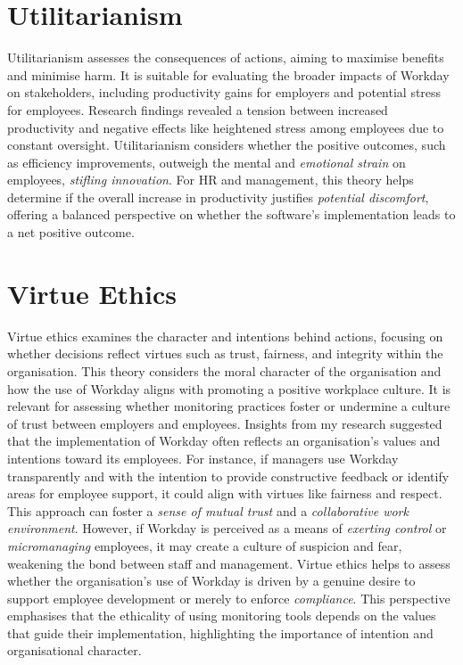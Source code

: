 \documentclass[a4paper]{article}
\begin{document}
\section*{Utilitarianism}
Utilitarianism assesses the consequences of actions, aiming to maximise benefits and minimise harm. It is suitable for evaluating the broader impacts of Workday on stakeholders, including productivity gains for employers and potential stress for employees.
Research findings revealed a tension between increased productivity and negative effects like heightened stress among employees due to constant oversight. Utilitarianism considers whether the positive outcomes, such as efficiency improvements, outweigh the mental and \textit{emotional strain} on employees, \textit{stifling innovation}. For HR and management, this theory helps determine if the overall increase in productivity justifies \textit{potential discomfort}, offering a balanced perspective on whether the software’s implementation leads to a net positive outcome.

\section*{Virtue Ethics}
Virtue ethics examines the character and intentions behind actions, focusing on whether decisions reflect virtues such as trust, fairness, and integrity within the organisation. This theory considers the moral character of the organisation and how the use of Workday aligns with promoting a positive workplace culture. It is relevant for assessing whether monitoring practices foster or undermine a culture of trust between employers and employees.
Insights from my research suggested that the implementation of Workday often reflects an organisation’s values and intentions toward its employees. For instance, if managers use Workday transparently and with the intention to provide constructive feedback or identify areas for employee support, it could align with virtues like fairness and respect. This approach can foster a \textit{sense of mutual trust} and a \textit{collaborative work environment}. However, if Workday is perceived as a means of \textit{exerting control} or \textit{micromanaging} employees, it may create a culture of suspicion and fear, weakening the bond between staff and management. Virtue ethics helps to assess whether the organisation’s use of Workday is driven by a genuine desire to support employee development or merely to enforce \textit{compliance}. This perspective emphasises that the ethicality of using monitoring tools depends on the values that guide their implementation, highlighting the importance of intention and organisational character.
\end{document}
